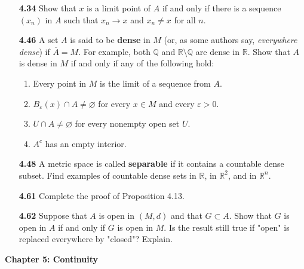 \documentclass[12pt]{amsart}
\def\iff{if and only if }
\def\QQ{{\mathbb Q}}
\def\RR{{\mathbb R}}
\renewcommand{\emptyset}{\varnothing}
\renewcommand{\epsilon}{\varepsilon}
\begin{document}
\begin{enumerate}
\item[\bf 4.34] Show that $x$ is a limit point of $A$ \iff there is a sequence $(x_n)$ in $A$ such that $x_n\to x$ and $x_n\neq x$ for all $n$.

\bigskip

\item[\bf 4.46] A set $A$ is said to be {\bf dense} in $M$ (or, as some authors say, \textit{everywhere dense}) if $\overline A=M$. For example, both $\QQ$ and $\RR\setminus\QQ$ are dense in $\RR$. Show that $A$ is dense in $M$ \iff any of the following hold: 
\medskip
	\begin{enumerate}[label={\bf (\alph*)}]
	\item Every point in $M$ is the limit of a sequence from $A$.
	\medskip
	\item $B_\epsilon(x)\cap A\neq \emptyset$ for every $x\in M$ and every $\epsilon>0$.
	\medskip
	\item $U\cap A\neq \emptyset$ for every nonempty open set $U$.
	\medskip
	\item $A^c$ has an empty interior. 
	\end{enumerate}

\bigskip

\item[\bf 4.48] A metric space is called {\bf separable} if it contains a countable dense subset. Find examples of countable dense sets in $\RR$, in $\RR^2$, and in $\RR^n$.

\bigskip

\item[\bf 4.61] Complete the proof of Proposition 4.13.

\bigskip

\item[\bf 4.62] Suppose that $A$ is open in $(M, d)$ and that $G\subset A$. Show that $G$ is open in $A$ \iff $G$ is open in $M$. Is the result still true if "open" is replaced everywhere by "closed"? Explain. 

\bigskip

\end{enumerate}

{\bf Chapter 5: Continuity}
\end{document}
